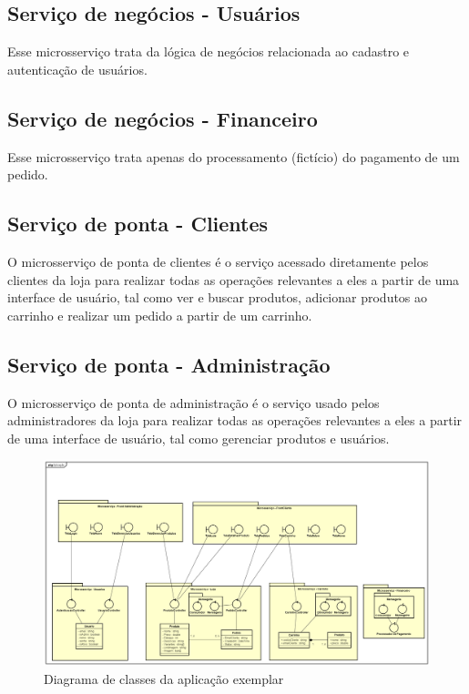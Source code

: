 \subsection*{Serviço de negócios - Usuários}
Esse microsserviço trata da lógica de negócios relacionada ao cadastro e autenticação de usuários.

\subsection*{Serviço de negócios - Financeiro}
Esse microsserviço trata apenas do processamento (fictício) do pagamento de um pedido.

\subsection*{Serviço de ponta - Clientes}
O microsserviço de ponta de clientes é o serviço acessado diretamente pelos clientes da loja para realizar todas as operações relevantes a eles a partir de uma interface de usuário, tal como ver e buscar produtos, adicionar produtos ao carrinho e realizar um pedido a partir de um carrinho.

\subsection*{Serviço de ponta - Administração}
O microsserviço de ponta de administração é o serviço usado pelos administradores da loja para realizar todas as operações relevantes a eles a partir de uma interface de usuário, tal como gerenciar produtos e usuários.


\begin{figure}[htb]
	\caption{\label{figura-diagrama-de-classes}Diagrama de classes da aplicação exemplar}
	\begin{center}
	    \includegraphics[scale=0.25]{Diagramas/imagens/Classes.png}
	\end{center}
\end{figure}

